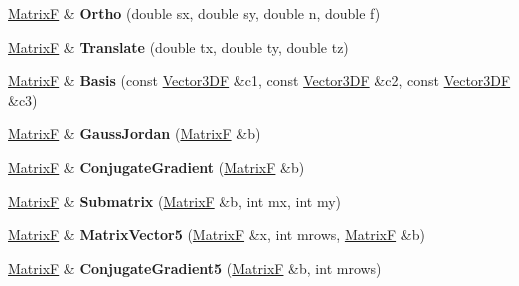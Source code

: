 \begin{DoxyCompactItemize}
\item 
\hypertarget{class_matrix_f_add4b8fc7ab8cd82142b32ff1d91b6ce1}{\hyperlink{class_matrix_f}{Matrix\+F} \& {\bfseries Ortho} (double sx, double sy, double n, double f)}\label{class_matrix_f_add4b8fc7ab8cd82142b32ff1d91b6ce1}

\item 
\hypertarget{class_matrix_f_ac47d0e4215219f8c2dda6cfc59b0c4d7}{\hyperlink{class_matrix_f}{Matrix\+F} \& {\bfseries Translate} (double tx, double ty, double tz)}\label{class_matrix_f_ac47d0e4215219f8c2dda6cfc59b0c4d7}

\item 
\hypertarget{class_matrix_f_aca93a651b7871689f376aff9bb55a302}{\hyperlink{class_matrix_f}{Matrix\+F} \& {\bfseries Basis} (const \hyperlink{class_vector3_d_f}{Vector3\+D\+F} \&c1, const \hyperlink{class_vector3_d_f}{Vector3\+D\+F} \&c2, const \hyperlink{class_vector3_d_f}{Vector3\+D\+F} \&c3)}\label{class_matrix_f_aca93a651b7871689f376aff9bb55a302}

\item 
\hypertarget{class_matrix_f_a160b22679d4ee649f12ba3d72d927ad6}{\hyperlink{class_matrix_f}{Matrix\+F} \& {\bfseries Gauss\+Jordan} (\hyperlink{class_matrix_f}{Matrix\+F} \&b)}\label{class_matrix_f_a160b22679d4ee649f12ba3d72d927ad6}

\item 
\hypertarget{class_matrix_f_a4000fdacc5b96824e39f04a7b79aec64}{\hyperlink{class_matrix_f}{Matrix\+F} \& {\bfseries Conjugate\+Gradient} (\hyperlink{class_matrix_f}{Matrix\+F} \&b)}\label{class_matrix_f_a4000fdacc5b96824e39f04a7b79aec64}

\item 
\hypertarget{class_matrix_f_a6b618f020070722d5a39945cc469e7e9}{\hyperlink{class_matrix_f}{Matrix\+F} \& {\bfseries Submatrix} (\hyperlink{class_matrix_f}{Matrix\+F} \&b, int mx, int my)}\label{class_matrix_f_a6b618f020070722d5a39945cc469e7e9}

\item 
\hypertarget{class_matrix_f_af2300341ce8c580b1463754f58d431fb}{\hyperlink{class_matrix_f}{Matrix\+F} \& {\bfseries Matrix\+Vector5} (\hyperlink{class_matrix_f}{Matrix\+F} \&x, int mrows, \hyperlink{class_matrix_f}{Matrix\+F} \&b)}\label{class_matrix_f_af2300341ce8c580b1463754f58d431fb}

\item 
\hypertarget{class_matrix_f_a7cbfeeaa97e85c30e382d7cff84e5fb5}{\hyperlink{class_matrix_f}{Matrix\+F} \& {\bfseries Conjugate\+Gradient5} (\hyperlink{class_matrix_f}{Matrix\+F} \&b, int mrows)}\label{class_matrix_f_a7cbfeeaa97e85c30e382d7cff84e5fb5}


\end{DoxyCompactItemize}
